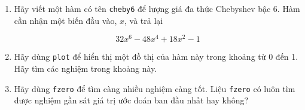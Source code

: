 \documentclass[12pt]{book}
\begin{document}
\begin{ex}

\begin{enumerate}

\item Hãy viết một hàm có tên {\tt cheby6} để lượng giá đa thức
Chebyshev bậc 6. Hàm cần nhận một biến đầu vào, $x$, và trả lại

\begin{equation}
32 x^6 - 48 x^4 + 18 x^2 - 1
\end{equation}

\item Hãy dùng {\tt plot} để hiển thị một đồ thị của hàm này trong
khoảng từ 0 đến 1. Hãy tìm các nghiệm trong khoảng này.

\item Hãy dùng {\tt fzero} để tìm càng nhiều nghiệm càng tốt. Liệu
{\tt fzero} có luôn tìm được nghiệm gần sát giá trị ước đoán ban đầu
nhất hay không?

\end{enumerate}
\end{ex}
\end{document}
